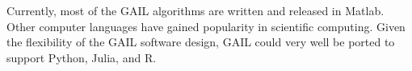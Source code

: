 Currently, most of the GAIL algorithms are written and released in Matlab. Other computer languages have gained popularity in scientific computing. Given the flexibility of the GAIL software design, GAIL could very well be ported to support Python, Julia, and R.
\begin{comment}
\begin{enumerate}

\item \texttt{assetPath}: A class of discretized stochastic processes that
model the values of an asset with respect to time

\item \texttt{optPayoff}: A class of option payoffs based on asset paths

\item \texttt{optPrice}: A class that computes the price of an option via
(quasi-)Monte Carlo methods.

\end{enumerate}


\alnote{Is there any future to support another popular scientific computing
language? like Julia ? Should we mention Fred's idea to bring other
collaborators? Or mention here interested collaborators contact us at--- ?}
\scnote{QMC Community software and OO classes}
\end{comment}
